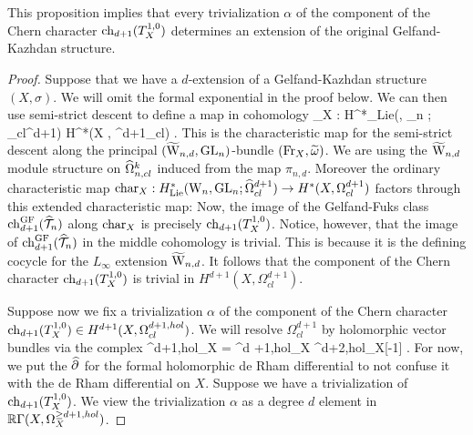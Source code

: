 This proposition implies that every trivialization $\alpha$ of the component of the Chern character $\ch_{d+1}(T_X^{1,0})$ determines an extension of the original Gelfand-Kazhdan structure. 

\begin{proof}
Suppose that we have a $d$-extension of a Gelfand-Kazhdan structure $(X,\sigma)$.
We will omit the formal exponential in the proof below.
We can then use semi-strict descent to define a map in cohomology
\ben
{}_X : H^*_{\rm Lie}(\TVectd, \GL_n ; \hOmega_{cl}^{d+1}) \to H^*(X , \Omega^{d+1}_{cl}) .
\een
This is the characteristic map for the semi-strict descent along the principal $(\TVectd,\GL_n)$-bundle $(\Fr_X , \Tilde{\omega})$.
We are using the $\TVectd$ module structure on $\hOmega^k_{n,cl}$ induced from the map $\pi_{n,d}$. 
Moreover the ordinary characteristic map ${\rm char}_X : H^*_{\rm Lie}(\Vect, \GL_n ; \hOmega_{cl}^{d+1}) \to H^*(X , \Omega^{d+1}_{cl})$ factors through this extended characteristic map:
\ben
{}
\een
Now, the image of the Gelfand-Fuks class $\ch_{d+1}^{\GF} (\hT_n)$ along ${\rm char}_X$ is precisely $\ch_{d+1}(T_X^{1,0})$. 
Notice, however, that the image of $\ch_{d+1}^\GF(\hT_n)$ in the middle cohomology is trivial.
This is because it is the defining cocycle for the $L_\infty$ extension $\TVectd$. 
It follows that the component of the Chern character $\ch_{d+1}(T_X^{1,0})$ is trivial in $H^{d+1}(X, \Omega^{d+1}_{cl})$. 

Suppose now we fix a trivialization $\alpha$ of the component of the Chern character $\ch_{d+1}(T_X^{1,0}) \in H^{d+1}(X, \Omega^{d+1, hol}_{cl})$.
We will resolve $\Omega^{d+1}_{cl}$ by holomorphic vector bundles via the complex
\ben
\Omega^{\geq d+1,hol}_X = \Omega^{d +1,hol}_X \xto{\Hat{\partial}} \Omega^{d+2,hol}_X[-1] \cdots .
\een
For now, we put the $\Hat{\partial}$ for the formal holomorphic de Rham differential to not confuse it with the de Rham differential on $X$.
Suppose we have a trivialization of $\ch_{d+1}(T_X^{1,0})$.
We view the trivialization $\alpha$ as a degree $d$ element in $\RR \Gamma(X, \Omega^{\geq d+1, hol}_X)$. 


\end{proof}

